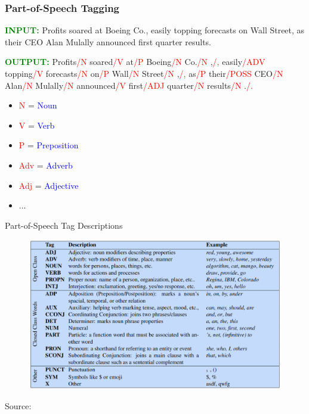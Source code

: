 \documentclass[handout]{beamer}
\begin{document}
\begin{frame}
  \frametitle{Part-of-Speech Tagging}
  \scriptsize
  \textcolor{green}{\textbf{INPUT:}}
  Profits soared at Boeing Co., easily topping forecasts on Wall Street, as their CEO Alan Mulally announced first quarter results.  \vspace{0.5cm}
  
  \textcolor{green}{\textbf{OUTPUT:}}
  Profits\textcolor{red}{/N} soared\textcolor{red}{/V} at\textcolor{red}{/P} Boeing\textcolor{red}{/N} Co.\textcolor{red}{/N} ,\textcolor{red}{/,} easily\textcolor{red}{/ADV} topping\textcolor{red}{/V} forecasts\textcolor{red}{/N} on\textcolor{red}{/P} Wall\textcolor{red}{/N} Street\textcolor{red}{/N} ,\textcolor{red}{/,} as\textcolor{red}{/P} their\textcolor{red}{/POSS} CEO\textcolor{red}{/N} Alan\textcolor{red}{/N} Mulally\textcolor{red}{/N} announced\textcolor{red}{/V} first\textcolor{red}{/ADJ} quarter\textcolor{red}{/N} results\textcolor{red}{/N} .\textcolor{red}{/.}
   \vspace{0.5cm}
  \begin{itemize}
    \item \textcolor{red}{N} = \textcolor{blue}{Noun}
    \item \textcolor{red}{V} = \textcolor{blue}{Verb}
    \item \textcolor{red}{P} = \textcolor{blue}{Preposition}
    \item \textcolor{red}{Adv} = \textcolor{blue}{Adverb}
    \item \textcolor{red}{Adj} = \textcolor{blue}{Adjective}
    \item ...
  \end{itemize}
\end{frame}

\begin{frame}[fragile]{Part-of-Speech Tag Descriptions}

  \begin{figure}[h]
        	\includegraphics[scale = 0.34]{pics/posTags.png}
        \end{figure}
Source: \cite{JurafskyBook}

\end{frame}
\end{document}
